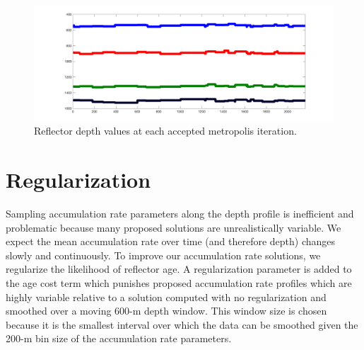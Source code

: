 \begin{figure}[ht]
\centering
\includegraphics[scale=0.3]{../analysis/figures/convergence3}
\caption[]{Reflector depth values at each accepted metropolis iteration.}
\label{fig:depthconvergence}
\end{figure}













\section{Regularization}\label{sec:regularization}

Sampling accumulation rate parameters along the depth profile is inefficient and problematic because many proposed solutions are unrealistically variable. We expect the mean accumulation rate over time (and therefore depth) changes slowly and continuously. To improve our accumulation rate solutions, we regularize the likelihood of reflector age. A regularization parameter is added to the age cost term which punishes proposed accumulation rate profiles which are highly variable relative to a solution computed with no regularization and smoothed over a moving 600-m depth window. This window size is chosen because it is the smallest interval over which the data can be smoothed given the 200-m bin size of the accumulation rate parameters. 

